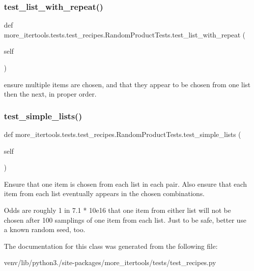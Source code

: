 \subsubsection{\texorpdfstring{test\+\_\+list\+\_\+with\+\_\+repeat()}{test\_list\_with\_repeat()}}
{\footnotesize\ttfamily def more\+\_\+itertools.\+tests.\+test\+\_\+recipes.\+Random\+Product\+Tests.\+test\+\_\+list\+\_\+with\+\_\+repeat (\begin{DoxyParamCaption}\item[{}]{self }\end{DoxyParamCaption})}

\begin{DoxyVerb}ensure multiple items are chosen, and that they appear to be chosen
from one list then the next, in proper order.\end{DoxyVerb}
 \mbox{\label{classmore__itertools_1_1tests_1_1test__recipes_1_1_random_product_tests_a67d44670f2f8e8ffa4ce4e17814aca61}} 
\subsubsection{\texorpdfstring{test\+\_\+simple\+\_\+lists()}{test\_simple\_lists()}}
{\footnotesize\ttfamily def more\+\_\+itertools.\+tests.\+test\+\_\+recipes.\+Random\+Product\+Tests.\+test\+\_\+simple\+\_\+lists (\begin{DoxyParamCaption}\item[{}]{self }\end{DoxyParamCaption})}

\begin{DoxyVerb}Ensure that one item is chosen from each list in each pair.
Also ensure that each item from each list eventually appears in
the chosen combinations.

Odds are roughly 1 in 7.1 * 10e16 that one item from either list will
not be chosen after 100 samplings of one item from each list. Just to
be safe, better use a known random seed, too.\end{DoxyVerb}
 

The documentation for this class was generated from the following file\+:\begin{DoxyCompactItemize}
\item 
venv/lib/python3./site-\/packages/more\+\_\+itertools/tests/test\+\_\+recipes.\+py\end{DoxyCompactItemize}
